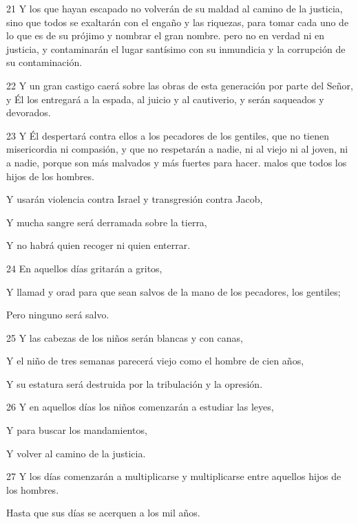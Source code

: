 \par 21 Y los que hayan escapado no volverán de su maldad al camino de la justicia, sino que todos se exaltarán con el engaño y las riquezas, para tomar cada uno de lo que es de su prójimo y nombrar el gran nombre. pero no en verdad ni en justicia, y contaminarán el lugar santísimo con su inmundicia y la corrupción de su contaminación.
\par 22 Y un gran castigo caerá sobre las obras de esta generación por parte del Señor, y Él los entregará a la espada, al juicio y al cautiverio, y serán saqueados y devorados.
\par 23 Y Él despertará contra ellos a los pecadores de los gentiles, que no tienen misericordia ni compasión, y que no respetarán a nadie, ni al viejo ni al joven, ni a nadie, porque son más malvados y más fuertes para hacer. malos que todos los hijos de los hombres.
\par    
\par     Y usarán violencia contra Israel y transgresión contra Jacob,  
\par     Y mucha sangre será derramada sobre la tierra,  
\par     Y no habrá quien recoger ni quien enterrar.
\par    
\par 24 En aquellos días gritarán a gritos,  
\par     Y llamad y orad para que sean salvos de la mano de los pecadores, los gentiles;  
\par     Pero ninguno será salvo.
\par    
\par 25 Y las cabezas de los niños serán blancas y con canas,  
\par     Y el niño de tres semanas parecerá viejo como el hombre de cien años,  
\par     Y su estatura será destruida por la tribulación y la opresión.
\par    
\par 26 Y en aquellos días los niños comenzarán a estudiar las leyes,  
\par     Y para buscar los mandamientos,  
\par     Y volver al camino de la justicia.
\par    
\par 27 Y los días comenzarán a multiplicarse y multiplicarse entre aquellos hijos de los hombres.  
\par     Hasta que sus días se acerquen a los mil años.  
